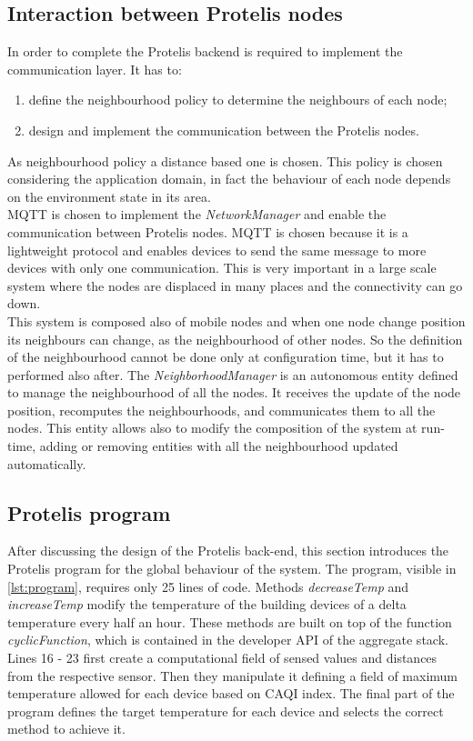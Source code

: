 \subsection*{Interaction between Protelis nodes}
In order to complete the Protelis backend is required to implement the communication layer. It has to:
\begin{enumerate}
    \item define the neighbourhood policy to determine the neighbours of each node;
    \item design and implement the communication between the Protelis nodes.
\end{enumerate}
As neighbourhood policy a distance based one is chosen. 
This policy is chosen considering the application domain, in fact the behaviour of each node depends on the environment state in its area.\\ 
MQTT is chosen to implement the \mbox{\textit{NetworkManager}} and enable the communication between Protelis nodes.
MQTT is chosen because it is a lightweight protocol and enables devices to send the same message to more devices with only one communication.
This is very important in a large scale system where the nodes are displaced in many places and the connectivity can go down. \\
This system is composed also of mobile nodes and when one node change position its neighbours can change, as the neighbourhood of other nodes. 
So the definition of the neighbourhood cannot be done only at configuration time, but it has to performed also after.
The \mbox{\textit{NeighborhoodManager}} is an autonomous entity defined to manage the neighbourhood of all the nodes.
It receives the update of the node position, recomputes the neighbourhoods, and communicates them to all the nodes. 
This entity allows also to modify the composition of the system at run-time, adding or removing entities with all the neighbourhood updated automatically.

\subsection{Protelis program}
After discussing the design of the Protelis back-end, this section introduces the Protelis program for the global behaviour of the system. 
The program, visible in \autoref{lst:program}, requires only 25 lines of code.
Methods \mbox{\textit{decreaseTemp}} and \mbox{\textit{increaseTemp}} modify the temperature of the building devices of a delta temperature every half an hour.
These methods are built on top of the function \mbox{\textit{cyclicFunction}}, which is contained in the developer API of the aggregate stack.
Lines 16 - 23 first create a computational field of sensed values and distances from the respective sensor. 
Then they manipulate it defining a field of maximum temperature allowed for each device based on CAQI index.
The final part of the program defines the target temperature for each device and selects the correct method to achieve it. 

